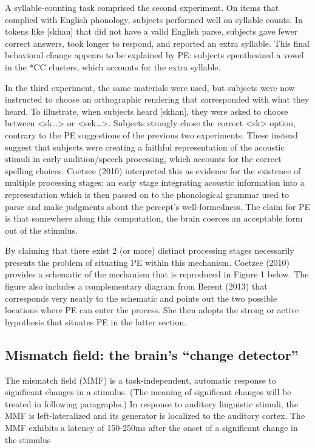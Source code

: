 \documentclass[jou,apacite]{apa6}
\begin{document}
    A syllable-counting task comprised the second experiment. On items that complied with English phonology, subjects performed well on syllable counts. In tokens like [skhan] that did not have a valid English parse, subjects gave fewer correct answers, took longer to respond, and reported an extra syllable. This final behavioral change appears to be explained by PE: subjects epenthesized a vowel in the *CC clusters, which accounts for the extra syllable.

    In the third experiment, the same materials were used, but subjects were now instructed to choose an orthographic rendering that corresponded with what they heard. To illustrate, when subjects heard [skhan], they were asked to choose between <sk…> or <sek…>. Subjects strongly chose the correct <sk> option, contrary to the PE suggestions of the previous two experiments. These instead suggest that subjects were creating a faithful representation of the acoustic stimuli in early audition/speech processing, which accounts for the correct spelling choices. Coetzee (2010) interpreted this as evidence for the existence of multiple processing stages: an early stage integrating acoustic information into a representation which is then passed on to the phonological grammar used to parse and make judgments about the percept’s well-formedness. The claim for PE is that somewhere along this computation, the brain coerces an acceptable form out of the stimulus.

    By claiming that there exist 2 (or more) distinct processing stages necessarily presents the problem of situating PE within this mechanism. Coetzee (2010) provides a schematic of the mechanism that is reproduced in Figure 1 below. The figure also includes a complementary diagram from Berent (2013) that corresponds very neatly to the schematic and points out the two possible locations where PE can enter the process. She then adopts the strong or active hypothesis that situates PE in the latter section.

    \subsection{Mismatch field: the brain's ``change detector''}

    The mismatch field (MMF) is a task-independent, automatic response to significant changes in a stimulus. (The meaning of significant changes will be treated in following paragraphs.) In response to auditory linguistic stimuli, the MMF is left-lateralized and its generator is localized to the auditory cortex. The MMF exhibits a latency of 150-250ms after the onset of a significant change in the stimulus
\end{document}
